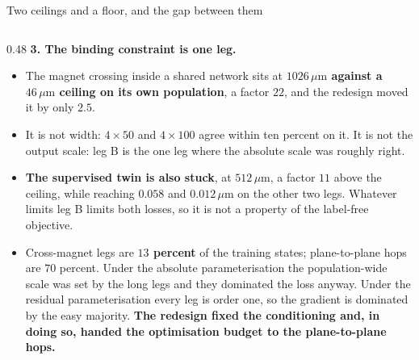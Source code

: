 \documentclass[aspectratio=169,10pt]{beamer}
\newcommand{\um}{\ensuremath{\,\mu\mathrm{m}}}
\newcommand{\hl}[1]{{\color{accent}\textbf{#1}}}
\newcommand{\bad}[1]{{\color{warm}\textbf{#1}}}
\begin{document}
\begin{frame}[shrink=25]{Two ceilings and a floor, and the gap between them}
\begin{columns}[T]
\begin{column}{0.48\textwidth}
      \textbf{3. The binding constraint is one leg.}
      \begin{itemize}\small
        \item The magnet crossing inside a shared network sits at \bad{$1026\um$
              against a $46\um$ ceiling on its own population}, a factor $22$,
              and the redesign moved it by only $2.5$.
        \item It is not width: $4\times50$ and $4\times100$ agree within ten
              percent on it. It is not the output scale: leg B is the one leg
              where the absolute scale was roughly right.
        \item \hl{The supervised twin is also stuck}, at $512\um$, a factor $11$
              above the ceiling, while reaching $0.058$ and $0.012\um$ on the
              other two legs. Whatever limits leg B limits both losses, so it is
              not a property of the label-free objective.
        \item Cross-magnet legs are \hl{$13$ percent} of the training states;
              plane-to-plane hops are $70$ percent. Under the absolute
              parameterisation the population-wide scale was set by the long legs
              and they dominated the loss anyway. Under the residual
              parameterisation every leg is order one, so the gradient is
              dominated by the easy majority. \bad{The redesign fixed the
              conditioning and, in doing so, handed the optimisation budget to
              the plane-to-plane hops.}
      \end{itemize}
    \end{column}
  \end{columns}
\end{frame}
\end{document}
